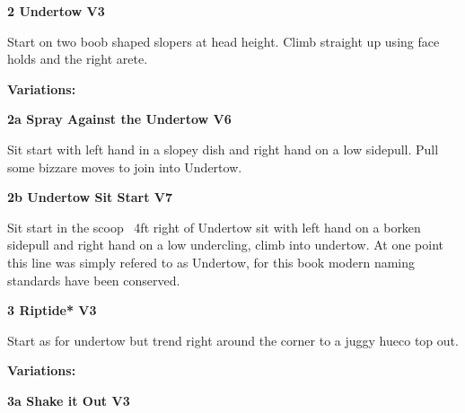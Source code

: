 \begin{multicols}{2}
\label{pt:Riptide}

					\begin{minipage}{\linewidth}	
					\label{rt:Undertow}
\colorbox{green!20}{
\textbf{
2 Undertow V3     
}
}

					\begin{adjustwidth}{0.5cm}{}				
					Start on two boob shaped slopers at head height. Climb straight up using face holds and the right arete.
					\end{adjustwidth}
					\end{minipage}
						\begin{adjustwidth}{0.5cm}{}				
						\textbf{Variations:} \newline
							\begin{minipage}{\linewidth}	
							\label{vr:Spray Against the Undertow}
\colorbox{RoyalBlue!20}{
\textbf{
2a Spray Against the Undertow V6  
}
}

							\begin{adjustwidth}{0.5cm}{}				
							Sit start with left hand in a slopey dish and right hand on a low sidepull. Pull some bizzare moves to join into Undertow.
							\end{adjustwidth}
							\end{minipage}
							\begin{minipage}{\linewidth}	
							\label{vr:Undertow Sit Start}
\colorbox{Goldenrod!50}{
\textbf{
2b Undertow Sit Start V7     
}
}

							\begin{adjustwidth}{0.5cm}{}				
							Sit start in the scoop ~4ft right of Undertow sit with left hand on a borken sidepull and right hand on a low undercling, climb into undertow. At one point this line was simply refered to as Undertow, for this book modern naming standards have been conserved.
							\end{adjustwidth}
							\end{minipage}
						\end{adjustwidth}
					\begin{minipage}{\linewidth}	
					\label{rt:Riptide}
\colorbox{green!20}{
\textbf{
3 Riptide* V3    
}
}

					\begin{adjustwidth}{0.5cm}{}				
					Start as for undertow but trend right around the corner to a juggy hueco top out.
					\end{adjustwidth}
					\end{minipage}
						\begin{adjustwidth}{0.5cm}{}				
						\textbf{Variations:} \newline
							\begin{minipage}{\linewidth}	
							\label{vr:Shake it Out}
\colorbox{green!20}{
\textbf{
3a Shake it Out V3   
}
}


\end{minipage}
\end{adjustwidth}
\end{multicols}
